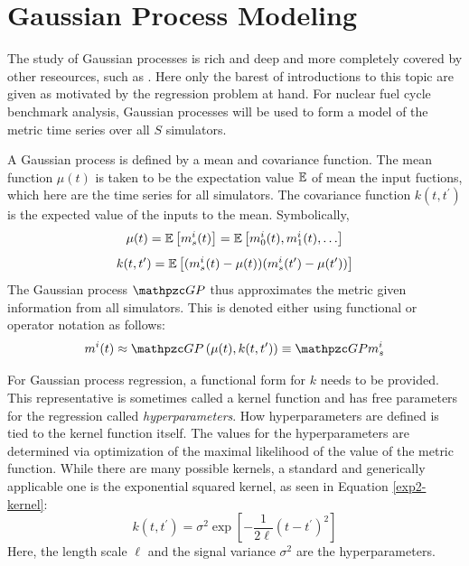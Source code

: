 \section{Gaussian Process Modeling}
\label{gp}
The study of Gaussian processes is rich and deep and more completely covered by 
other reseources, such as \cite{rasmussen2006gaussian}. Here only the barest of 
introductions to this topic are given as motivated by the regression problem at
hand. For nuclear fuel cycle benchmark analysis, Gaussian processes will be used
to form a model of the metric time series over all $S$ simulators. 

A Gaussian process is defined by a mean and covariance function. 
The mean function $\mu(t)$ is taken to be the expectation value $\mathbb{E}$ of mean
the input fuctions, which here are the time series for all simulators. The
covariance function $k(t, t^\prime)$ is the expected value of the inputs to the 
mean. Symbolically, 
\begin{equation}
\label{mean-func}
\mu(t) = \mathbb{E}\left[m_s^i(t)\right] = \mathbb{E}\left[m_0^i(t), m_1^i(t), \ldots\right]
\end{equation}
\begin{equation}
\label{covar-func}
k(t, t^\prime) = \mathbb{E}\left[(m_s^i(t) - \mu(t))(m_s^i(t^\prime) - \mu(t^\prime))\right]
\end{equation}
The Gaussian process $\GP$ thus approximates the metric given information from all 
simulators. This is denoted either using functional or operator notation as follows:
\begin{equation}
\label{gp-def-approx}
m^i(t) \approx \GP\left(\mu(t), k(t, t^\prime)\right) \equiv \GP m_s^i
\end{equation}

For Gaussian process regression, a functional form for $k$ needs to be provided.
This representative is sometimes called a kernel function and has free parameters 
for the regression called \emph{hyperparameters}. How hyperparameters are defined is 
tied to the kernel function itself. The values for the hyperparameters are determined
via optimization of the maximal likelihood of the value of the metric function.
While there are many possible kernels, a standard and generically applicable one 
is the exponential squared kernel, as seen in Equation \ref{exp2-kernel}:
\begin{equation}
\label{exp2-kernel}
k(t, t^\prime) = \sigma^2 \exp\left[-\frac{1}{2\ell}(t - t^\prime)^2 \right]
\end{equation}
Here, the length scale $\ell$ and the signal variance $\sigma^2$ are the 
hyperparameters.

